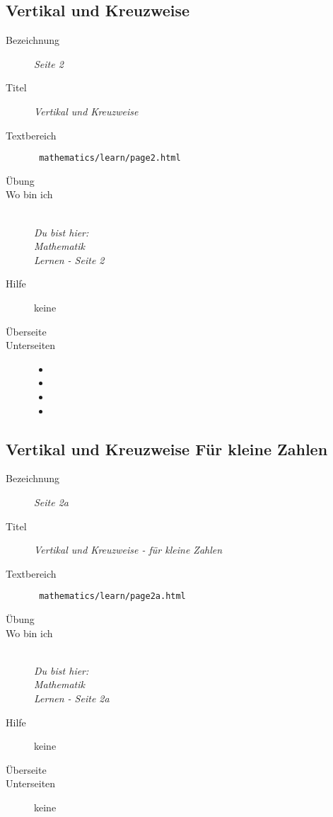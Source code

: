 \subsection{ Vertikal und Kreuzweise }
\label{cha:math-learn-page2}
\begin{description}
  \item[Bezeichnung] \emph{ Seite 2 }
  \item[Titel] \emph{ Vertikal und Kreuzweise }
  \item[Textbereich] \texttt{ mathematics/learn/page2.html }
  \item[Übung] 
  \item[Wo bin ich] \emph{\\Du bist hier:\\Mathematik\\Lernen - Seite 2 }
  \item[Hilfe] keine
  \item[Überseite] 
  \item[Unterseiten]
  \begin{itemize}
    \item {}
    \item {}
    \item {}
    \item {}
  \end{itemize}
\end{description}


\subsection{ Vertikal und Kreuzweise Für kleine Zahlen }
\label{cha:math-learn-page2a}
\begin{description}
  \item[Bezeichnung] \emph{ Seite 2a }
  \item[Titel] \emph{ Vertikal und Kreuzweise - für kleine Zahlen }
  \item[Textbereich] \texttt{ mathematics/learn/page2a.html }
  \item[Übung] 
  \item[Wo bin ich] \emph{\\Du bist hier:\\Mathematik\\Lernen - Seite 2a }
  \item[Hilfe] keine
  \item[Überseite] 
  \item[Unterseiten] keine
\end{description}


